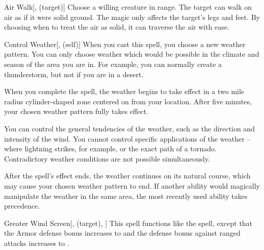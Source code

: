 \lowercase{\hypertarget{spell:Air Walk}{}}\label{spell:Air Walk}
\begin{attuneability}[\nth{4}]{\hypertarget{spell:Air Walk}{Air Walk}}[,  (target)]
Choose a willing creature in \rngclose range.
The target can walk on air as if it were solid ground.
The magic only affects the target's legs and feet.
By choosing when to treat the air as solid, it can traverse the air with ease.
\end{attuneability}
\vspace{0.25em}



\lowercase{\hypertarget{spell:Control Weather}{}}\label{spell:Control Weather}
\begin{attuneability}[\nth{4}]{\hypertarget{spell:Control Weather}{Control Weather}}[,  (self)]
When you cast this spell, you choose a new weather pattern.
You can only choose weather which would be possible in the climate and season of the area you are in.
For example, you can normally create a thunderstorm, but not if you are in a desert.

When you complete the spell, the weather begins to take effect in a two mile radius cylinder-shaped zone centered on from your location.
After five minutes, your chosen weather pattern fully takes effect.

You can control the general tendencies of the weather, such as the direction and intensity of the wind.
You cannot control specific applications of the weather -- where lightning strikes, for example, or the exact path of a tornado.
Contradictory weather conditions are not possible simultaneously.

After the spell's effect ends, the weather continues on its natural course, which may cause your chosen weather pattern to end.
If another ability would magically manipulate the weather in the same area, the most recently used ability takes precedence.
\end{attuneability}
\vspace{0.25em}



\lowercase{\hypertarget{spell:Greater Wind Screen}{}}\label{spell:Greater Wind Screen}
\begin{attuneability}[\nth{4}]{\hypertarget{spell:Greater Wind Screen}{Greater Wind Screen}}[,  (target), ]
This spell functions like the  spell, except that the Armor defense bonus increases to  and the defense bonus against ranged attacks increases to .
\end{attuneability}
\vspace{0.25em}



